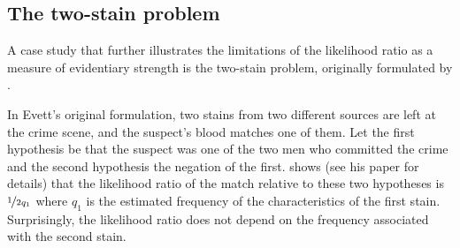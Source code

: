 \documentclass{article}
\begin{document}


 \subsection{The two-stain problem}
\label{subsec:two-stain}


A case study that further illustrates the limitations of 
the likelihood ratio as a measure of evidentiary strength is the 
two-stain problem, originally formulated by \cite{Evett1987}.

%
%
%
%
In Evett's original formulation, 
two stains from two different sources are left at the crime scene, and the suspect's blood matches one of them. %
%
%
Let the first hypothesis be that the suspect was one of the two men who committed the crime and the second hypothesis the negation of the first. 
%
\cite{Evett1987} shows (see his paper for details) that the likelihood ratio of the match relative to these two hypotheses is $\nicefrac{1}{2q_1}$ where $q_1$ is the estimated frequency  of the characteristics of the first stain. Surprisingly, the likelihood ratio does not depend on the frequency associated with the second stain. 
\end{document}
